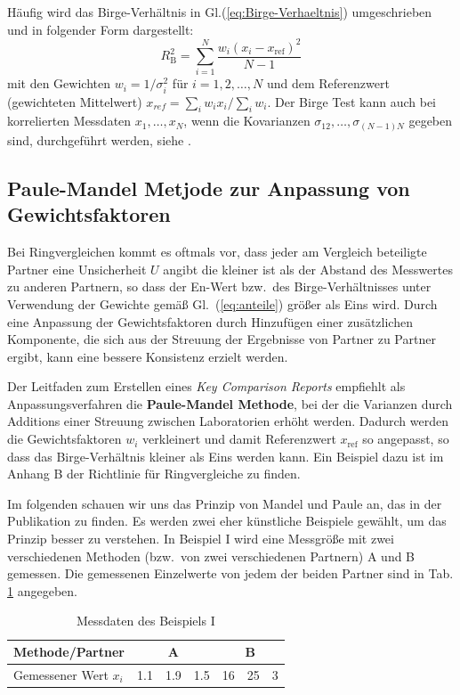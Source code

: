 Häufig wird das Birge-Verhältnis in Gl.(\ref{eq:Birge-Verhaeltnis}) 
umgeschrieben und in folgender Form dargestellt:
\begin{equation}
R_\mathrm{B}^2 = \sum_{i=1}^N \frac{w_i (x_i - x_\mathrm{ref})^2}{N-1}
\end{equation}
mit den Gewichten $w_i = 1/\sigma_i^2$ für $i=1,2,\ldots, N$ und dem 
Referenzwert (gewichteten Mittelwert) $x_{ref}=\sum_i w_i x_i / \sum_i w_i$.
Der Birge Test kann auch bei korrelierten Messdaten $x_1,\ldots ,x_N$, wenn die 
Kovarianzen $\sigma_{12},\ldots, \sigma_{(N-1)N}$ gegeben sind, durchgeführt werden, siehe \cite{Kac08}.

\subsection{Paule-Mandel Metjode zur Anpassung von Gewichtsfaktoren}

Bei Ringvergleichen kommt es oftmals vor, dass jeder am Vergleich beteiligte Partner eine
Unsicherheit $U$ angibt die kleiner ist als der Abstand des Messwertes zu anderen Partnern,
so dass der En-Wert bzw.\ des Birge-Verhältnisses unter Verwendung der Gewichte gemäß Gl.~(\ref{eq:anteile})
größer als Eins wird. Durch eine Anpassung der Gewichtsfaktoren durch Hinzufügen einer
zusätzlichen Komponente, die sich aus der Streuung der Ergebnisse von Partner zu Partner ergibt,
kann eine bessere Konsistenz erzielt werden.

Der Leitfaden zum Erstellen eines \textsl{Key Comparison Reports}
\cite{GuideKey} empfiehlt als Anpassungsverfahren die \textbf{Paule-Mandel Methode},
bei der die Varianzen durch Additions einer Streuung zwischen Laboratorien
erhöht werden. Dadurch werden die Gewichtsfaktoren $w_i$ verkleinert und damit Referenzwert 
$x_\mathrm{ref}$ so angepasst, so dass das Birge-Verhältnis kleiner als Eins werden kann.
Ein Beispiel dazu ist im Anhang B der Richtlinie für Ringvergleiche \cite{GuideKey} zu finden.

Im folgenden schauen wir uns das Prinzip von Mandel und Paule an, das 
in der Publikation \cite{Pau82} zu finden. Es werden zwei eher künstliche Beispiele gewählt, um das Prinzip besser zu verstehen. 
In Beispiel I wird eine Messgröße mit zwei verschiedenen Methoden (bzw.\ von zwei verschiedenen Partnern) A und B gemessen.
Die gemessenen Einzelwerte von jedem der beiden Partner sind in Tab. \ref*{tab:Beispiel_I}
angegeben.
\begin{table}[!htb]
	\caption{Messdaten des Beispiels I}
	\begin{center}
	\begin{tabular}{l| rrr |rrr}
		\hline 
		Methode/Partner & \multicolumn{3}{c}{A} \vline & \multicolumn{3}{c}{B} \\ \hline
		Gemessener Wert $x_i$ & 1.1 & 1.9 & 1.5 & 16 & 25 & 3 \\ \hline
	\end{tabular}
\end{center}
\label{tab:Beispiel_I}
\end{table}

